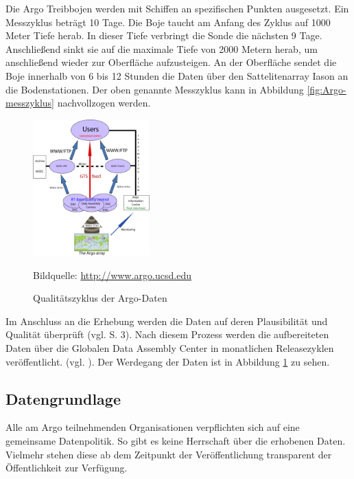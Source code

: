     Die Argo Treibbojen werden mit Schiffen an spezifischen Punkten ausgesetzt. Ein Messzyklus beträgt 10 Tage. Die Boje taucht am Anfang des Zyklus auf 1000 Meter Tiefe herab.  In dieser Tiefe verbringt die Sonde die nächsten 9 Tage. Anschließend sinkt sie auf die maximale Tiefe von 2000 Metern herab, um anschließend wieder zur Oberfläche aufzusteigen. An der Oberfläche sendet die Boje innerhalb von 6 bis 12 Stunden die Daten über den Sattelitenarray Iason an die Bodenstationen. Der oben genannte Messzyklus kann in Abbildung \ref{fig:Argo-messzyklus} nachvollzogen werden.
   
    \begin{figure}[!ht]
        \centering
        \includegraphics[width=0.4\textwidth]{pix/RT-Data-flow}
        \caption[Qualitätszyklus der Argo-Daten]{Qualitätszyklus der Argo-Daten}
        \footnotesize{
            Bildquelle: \href{http://www.argo.ucsd.edu/Argo_data_and.html}%
                        {\url{http://www.argo.ucsd.edu}}
        }
        
        
        \label{fig:argo_dataflow}
    \end{figure}
    
    Im Anschluss an die Erhebung werden die Daten auf deren Plausibilität und Qualität überprüft (vgl. \cite{ArgoDataBeginnersGuide} S. 3). Nach diesem Prozess werden die aufbereiteten Daten über die Globalen Data Assembly Center in monatlichen Releasezyklen veröffentlicht. (vgl. \cite{Argofloa92:online}). Der Werdegang der Daten ist in Abbildung \ref{fig:argo_dataflow} zu sehen.

\subsection{Datengrundlage}
    

    Alle am Argo teilnehmenden Organisationen verpflichten sich auf eine gemeinsame Datenpolitik. So gibt es keine Herrschaft über die erhobenen Daten. Vielmehr stehen diese ab dem Zeitpunkt der Veröffentlichung transparent der Öffentlichkeit zur Verfügung.
    
